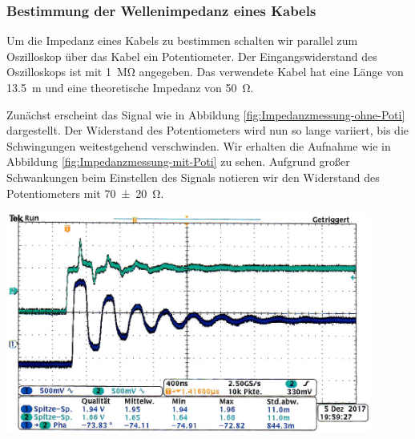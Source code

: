 \subsubsection*{Bestimmung der Wellenimpedanz eines Kabels}
%
Um die Impedanz eines Kabels zu bestimmen schalten wir parallel zum Oszilloskop über das Kabel ein Potentiometer.
Der Eingangswiderstand des Oszilloskops ist mit \SI{1}{\mega\ohm} angegeben.
Das verwendete Kabel hat eine Länge von \SI{13,5}{\meter} und eine theoretische Impedanz von \SI{50}{\ohm}.
%
\par
%
Zunächst erscheint das Signal wie in Abbildung \ref{fig:Impedanzmessung-ohne-Poti} dargestellt.
Der Widerstand des Potentiometers wird nun so lange variiert, bis die Schwingungen weitestgehend verschwinden.
Wir erhalten die Aufnahme wie in Abbildung \ref{fig:Impedanzmessung-mit-Poti} zu sehen.
Aufgrund großer Schwankungen beim Einstellen des Signals notieren wir den Widerstand des Potentiometers mit \SI{70 \pm 20}{\ohm}.
%
\par
%
\minipage{\linewidth}
    \begin{center}
        \captionsetup{type=figure}
        \begin{adjustbox}{max width=\linewidth, keepaspectratio}
            \includegraphics[width=120mm]{jpg/Impedanzmessung-ohne-Poti}
        \end{adjustbox}
        \label{fig:Impedanzmessung-ohne-Poti}
    \end{center}
\endminipage
%
\par
%
\minipage{\linewidth}
